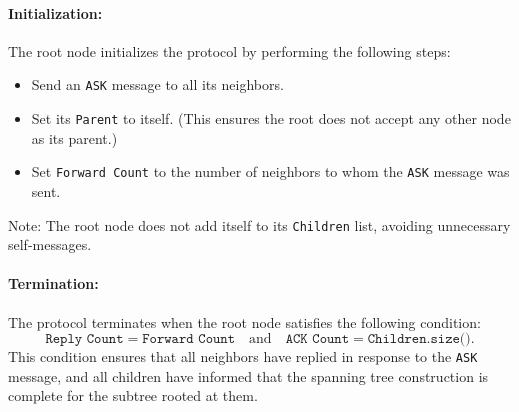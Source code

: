 \paragraph{Initialization:}
The root node initializes the protocol by performing the following steps:
\begin{itemize}
    \item Send an \texttt{ASK} message to all its neighbors.
    \item Set its \texttt{Parent} to itself. (This ensures the root does not accept any other node as its parent.)
    \item Set \texttt{Forward Count} to the number of neighbors to whom the \texttt{ASK} message was sent.
\end{itemize}
Note: The root node does not add itself to its \texttt{Children} list, avoiding unnecessary self-messages.

\paragraph{Termination:}
The protocol terminates when the root node satisfies the following condition:
\[\texttt{Reply Count} = \texttt{Forward Count} \quad \text{and} \quad \texttt{ACK Count} = \texttt{Children.size()}.\]
This condition ensures that all neighbors have replied in response to the \texttt{ASK} message, and all children have informed that the spanning tree construction is complete for the subtree rooted at them.
